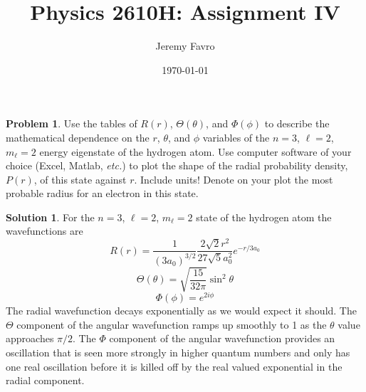 \documentclass[10pt]{article}
\title{Physics 2610H: Assignment IV}
\author{Jeremy Favro}
\date{\today}
\theoremstyle{definition}
\newtheorem{problem}{Problem}
\newtheorem{soln}{Solution}
\begin{document}
\maketitle

\begin{problem}
Use the tables of $R(r)$, $\Theta(\theta)$, and $\Phi(\phi)$ to describe the mathematical dependence on the $r$, $\theta$, and $\phi$
variables of the $n = 3$, $\ell=2$, $m_\ell=2$ energy eigenstate of the hydrogen atom. Use computer software of
your choice (Excel, Matlab, \emph{etc.}) to plot the shape of the radial probability density, $P(r)$, of this state
against $r$. Include units! Denote on your plot the most probable radius for an electron in this state.
\end{problem}
\begin{soln} For the $n = 3$, $\ell=2$, $m_\ell=2$ state of the hydrogen atom the wavefunctions are
  $$R(r)=\frac{1}{\left(3a_0\right)^{3/2}}\frac{2\sqrt{2}r^2}{27\sqrt{5}a_0^2}e^{-r/3a_0}$$
  $$\Theta(\theta)=\sqrt{\frac{15}{32\pi}}\sin^2\theta$$
  $$\Phi(\phi)=e^{2i\phi}$$
  The radial wavefunction decays exponentially as we would expect it should. The $\Theta$ component of the angular wavefunction ramps up smoothly to 1
  as the $\theta$ value approaches $\pi/2$. The $\Phi$ component of the angular wavefunction provides an oscillation that is seen more strongly in
  higher quantum numbers and only has one real oscillation before it is killed off by the real valued exponential in the radial component.
  \begin{center}
  \end{center}
\end{soln}
\newpage
\end{document}
